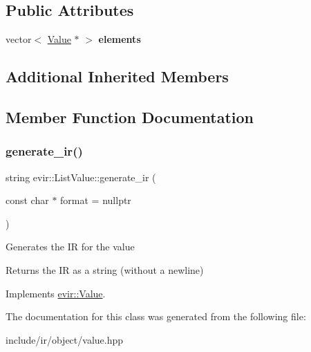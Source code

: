 \subsection*{Public Attributes}
\begin{DoxyCompactItemize}
\item 
\mbox{\label{classevir_1_1ListValue_a4b719e7544de6576a988822950be4b5c}} 
vector$<$ \hyperlink{classevir_1_1Value}{Value} $\ast$ $>$ {\bfseries elements}
\end{DoxyCompactItemize}
\subsection*{Additional Inherited Members}


\subsection{Member Function Documentation}
\mbox{\label{classevir_1_1ListValue_aebd962d9117d8cd22d35bf217975dcff}} 
\subsubsection{\texorpdfstring{generate\+\_\+ir()}{generate\_ir()}}
{\footnotesize\ttfamily string evir\+::\+List\+Value\+::generate\+\_\+ir (\begin{DoxyParamCaption}\item[{const char $\ast$}]{format = {\ttfamily nullptr} }\end{DoxyParamCaption})\hspace{0.3cm}{\ttfamily [virtual]}}

Generates the IR for the value \begin{DoxyReturn}{Returns}
the IR as a string (without a newline) 
\end{DoxyReturn}


Implements \hyperlink{classevir_1_1Value_a3e7e5bc634fd5bba528324076fe2a763}{evir\+::\+Value}.



The documentation for this class was generated from the following file\+:\begin{DoxyCompactItemize}
\item 
include/ir/object/value.\+hpp\end{DoxyCompactItemize}
